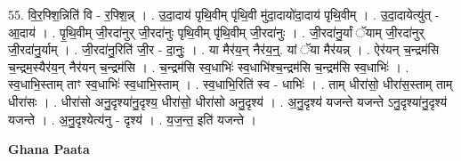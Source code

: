 \documentclass[17pt]{extarticle}
\begin{document}
55. वि॒र॒फ्शि॒न्निति॑ वि - र॒फ्शि॒न्न् । . उ॒दा॒दाय॑ पृथि॒वीम् पृ॑थि॒वी मु॑दा॒दायो॑दा॒दाय॑ पृथि॒वीम् । . उ॒दा॒दायेत्यु॑त् - आ॒दाय॑ । . पृ॒थि॒वीम् जी॒रदा॑नुर् जी॒रदा॑नुः पृथि॒वीम् पृ॑थि॒वीम् जी॒रदा॑नुः । . जी॒रदा॑नु॒र्यां ॅयाम् जी॒रदा॑नुर् जी॒रदा॑नु॒र्याम् । . जी॒रदा॑नु॒रिति॑ जी॒र - दा॒नुः॒ । . या मैर॑य॒न् नैर॑य॒न्॒. यां ॅया मैर॑यन्न् । . ऐर॑यन् च॒न्द्रम॑सि च॒न्द्रम॒स्यैर॑य॒न् नैर॑यन् च॒न्द्रम॑सि । . च॒न्द्रम॑सि स्व॒धाभिः॑ स्व॒धाभि॑श्च॒न्द्रम॑सि च॒न्द्रम॑सि स्व॒धाभिः॑ । . स्व॒धाभि॒स्ताम् ताꣳ स्व॒धाभिः॑ स्व॒धाभि॒स्ताम् । . स्व॒धाभि॒रिति॑ स्व - धाभिः॑ । . ताम् धीरा॑सो॒ धीरा॑स॒स्ताम् ताम् धीरा॑सः । . धीरा॑सो अनु॒दृश्या॑नु॒दृश्य॒ धीरा॑सो॒ धीरा॑सो अनु॒दृश्य॑ । . अ॒नु॒दृश्य॑ यजन्ते यजन्ते ऽनु॒दृश्या॑नु॒दृश्य॑ यजन्ते । . अ॒नु॒दृश्येत्य॑नु - दृश्य॑ । . य॒ज॒न्त॒ इति॑ यजन्ते । \newline

\textbf{Ghana Paata } \newline
\end{document}
